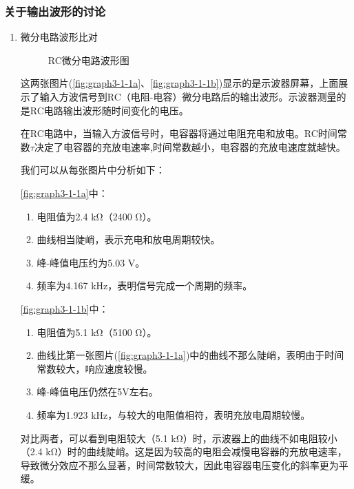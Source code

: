 \documentclass[dvipsnames, svgnames,a4paper,11pt]{article}
\begin{document}
	\subsubsection{关于输出波形的讨论}
	\begin{enumerate}
		\item 微分电路波形比对
		
		\begin{figure}[htbp]
			\centering
			\quad
			\quad
			\caption{RC微分电路波形图}
			\label{fig:graph3-1-1}
		\end{figure}
		
		
		这两张图片(\cref{fig:graph3-1-1a}、\cref{fig:graph3-1-1b})显示的是示波器屏幕，上面展示了输入方波信号到RC（电阻-电容）微分电路后的输出波形。示波器测量的是RC电路输出波形随时间变化的电压。


		
		在RC电路中，当输入方波信号时，电容器将通过电阻充电和放电。RC时间常数$\tau$决定了电容器的充放电速率,时间常数越小，电容器的充放电速度就越快。
		
		我们可以从每张图片中分析如下：
		
		\cref{fig:graph3-1-1a}中：
		\begin{enumerate}
			\item 电阻值为2.4 kΩ（2400 Ω）。
			\item 曲线相当陡峭，表示充电和放电周期较快。
			\item 峰-峰值电压约为5.03 V。
			\item 频率为4.167 kHz，表明信号完成一个周期的频率。
		\end{enumerate}

		\cref{fig:graph3-1-1b}中：
		\begin{enumerate}
			\item 电阻值为5.1 kΩ（5100 Ω）。
			\item 曲线比第一张图片(\cref{fig:graph3-1-1a})中的曲线不那么陡峭，表明由于时间常数较大，响应速度较慢。
			\item 峰-峰值电压仍然在5V左右。
			\item 频率为1.923 kHz，与较大的电阻值相符，表明充放电周期较慢。
		\end{enumerate}

		
		对比两者，可以看到电阻较大（5.1 kΩ）时，示波器上的曲线不如电阻较小（2.4 kΩ）时的曲线陡峭。这是因为较高的电阻会减慢电容器的充放电速率，导致微分效应不那么显著，时间常数较大，因此电容器电压变化的斜率更为平缓。
		

\end{enumerate}
\end{document}
